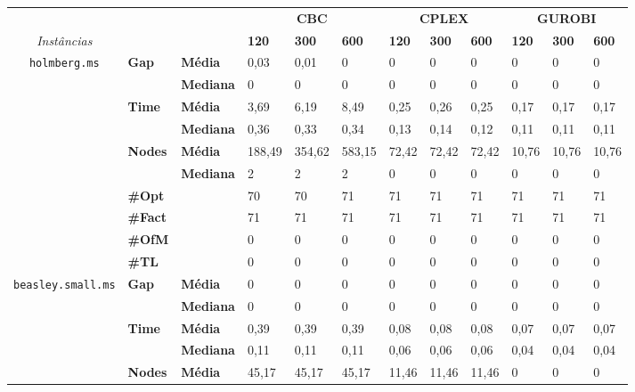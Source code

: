 
\begin{table}[]
	\begin{adjustbox}{angle=90}
	\begin{tabular}{cll|lll|lll|lll}
	& & & \multicolumn{3}{c}{\textbf{CBC}} & \multicolumn{3}{c}{\textbf{CPLEX}} & \multicolumn{3}{c}{\textbf{GUROBI}} 	\\\textit{Instâncias} & & & \textbf{120} & \textbf{300} & \textbf{600} & \textbf{120} & \textbf{300} & \textbf{600} & \textbf{120} & \textbf{300} & \textbf{600} \\
\hline
\multirow{7}{*}{\texttt{holmberg.ms}} & \multirow{2}{*}{\textbf{Gap}} & \textbf{Média} & 0,03 & 0,01 & 0 & 0 & 0 & 0 & 0 & 0 & 0 \\
 & & \textbf{Mediana} & 0 & 0 & 0 & 0 & 0 & 0 & 0 & 0 & 0 \\
\cline{2-12}
 & \multirow{2}{*}{\textbf{Time}} & \textbf{Média} & 3,69 & 6,19 & 8,49 & 0,25 & 0,26 & 0,25 & 0,17 & 0,17 & 0,17 \\
 & & \textbf{Mediana} & 0,36 & 0,33 & 0,34 & 0,13 & 0,14 & 0,12 & 0,11 & 0,11 & 0,11 \\
\cline{2-12}
 & \multirow{2}{*}{\textbf{Nodes}} & \textbf{Média} & 188,49 & 354,62 & 583,15 & 72,42 & 72,42 & 72,42 & 10,76 & 10,76 & 10,76 \\
 & & \textbf{Mediana} & 2 & 2 & 2 & 0 & 0 & 0 & 0 & 0 & 0 \\
\cline{2-12}
 & \textbf{\#Opt} & & 70 & 70 & 71 & 71 & 71 & 71 & 71 & 71 & 71 \\
 & \textbf{\#Fact} & & 71 & 71 & 71 & 71 & 71 & 71 & 71 & 71 & 71 \\
 & \textbf{\#OfM} & & 0 & 0 & 0 & 0 & 0 & 0 & 0 & 0 & 0 \\
 & \textbf{\#TL} & & 0 & 0 & 0 & 0 & 0 & 0 & 0 & 0 & 0 \\
\hline
\multirow{7}{*}{\texttt{beasley.small.ms}} & \multirow{2}{*}{\textbf{Gap}} & \textbf{Média} & 0 & 0 & 0 & 0 & 0 & 0 & 0 & 0 & 0 \\
 & & \textbf{Mediana} & 0 & 0 & 0 & 0 & 0 & 0 & 0 & 0 & 0 \\
\cline{2-12}
 & \multirow{2}{*}{\textbf{Time}} & \textbf{Média} & 0,39 & 0,39 & 0,39 & 0,08 & 0,08 & 0,08 & 0,07 & 0,07 & 0,07 \\
 & & \textbf{Mediana} & 0,11 & 0,11 & 0,11 & 0,06 & 0,06 & 0,06 & 0,04 & 0,04 & 0,04 \\
\cline{2-12}
 & \multirow{2}{*}{\textbf{Nodes}} & \textbf{Média} & 45,17 & 45,17 & 45,17 & 11,46 & 11,46 & 11,46 & 0 & 0 & 0 \\

\end{tabular}
\end{adjustbox}
\end{table}
